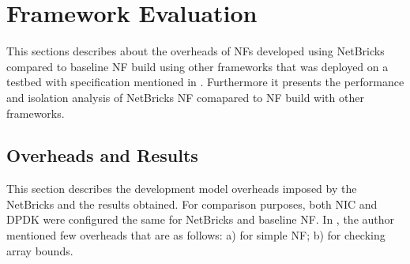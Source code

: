 \documentclass[10pt, a4paper, conference]{IEEEtran}
\begin{document}
\section{Framework Evaluation}
This sections describes about the overheads of NFs developed using NetBricks compared to baseline NF build using other frameworks that was deployed on a testbed with specification mentioned in \cite{Panda2016}. Furthermore it presents the performance and isolation analysis of NetBricks NF comapared to NF build with other frameworks.

\subsection{Overheads and Results}
This section describes the development model overheads imposed by the NetBricks and the results obtained. For comparison purposes, both NIC and DPDK were configured the same for NetBricks and baseline NF. In \cite{Panda2016}, the author mentioned few overheads that are as follows: a) for simple NF; b) for checking array bounds.
\end{document}
